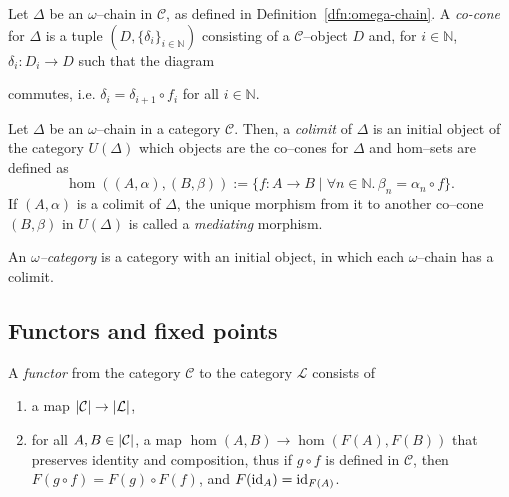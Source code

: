 \begin{dfn}\label{dfn:co-cone}
  Let \(\Delta\) be an \(\omega\)--chain in \(\mathcal{C}\), as defined in Definition~\ref{dfn:omega-chain}.
  A \emph{co-cone} for \(\Delta\) is a tuple \((D,\lbrace \delta_i \rbrace_{i \in \mathbb{N}})\) consisting of a \(\mathcal{C}\)--object \(D\) and, for \(i \in \mathbb{N}\), \(\delta_i \colon D_i \to D\) such that the diagram
  \begin{center}
  \end{center}
  commutes, i.e. \(\delta_i = \delta_{i+1} \circ f_i\) for all \(i \in \mathbb{N}\).
\end{dfn}

\begin{dfn}
  Let \(\Delta\) be an \(\omega\)--chain in a category \(\mathcal{C}\).
  Then, a \emph{colimit} of \(\Delta\) is an initial object of the category \(U(\Delta)\) which objects are the co--cones for \(\Delta\) and hom--sets are defined as
  \begin{equation}
    \hom((A,\alpha),(B,\beta)) := \lbrace f \colon A \to B \mid
    \forall n \in \mathbb{N}.\,\beta_n = \alpha_n \circ f \rbrace.
  \end{equation}
  If \((A,\alpha)\) is a colimit of \(\Delta\), the unique morphism from it to another co--cone \((B,\beta)\) in \(U(\Delta)\) is called a \emph{mediating} morphism.
\end{dfn}

\begin{dfn}
  An \emph{\(\omega\)--category} is a category with an initial object, in which each \(\omega\)--chain has a colimit. 
\end{dfn}

\subsection{Functors and fixed points}

\begin{dfn}
  A \emph{functor} from the category \(\mathcal{C}\) to the category \(\mathcal{L}\) consists of
  \begin{enumerate}
    \item a map \(\lvert \mathcal{C} \rvert \to \lvert \mathcal{L} \rvert\),
    \item for all \(A, B \in \lvert \mathcal{C} \rvert\), a map \(\hom(A,B) \to \hom(F(A),F(B))\) that preserves identity and composition, thus
      if \(g \circ f\) is defined in \(\mathcal{C}\), then
            \(F(g \circ f) = F(g) \circ F(f)\), and
            \(F(\mathrm{id}_{A}) = \mathrm{id}_{F(A)}\).
  \end{enumerate}
\end{dfn}

